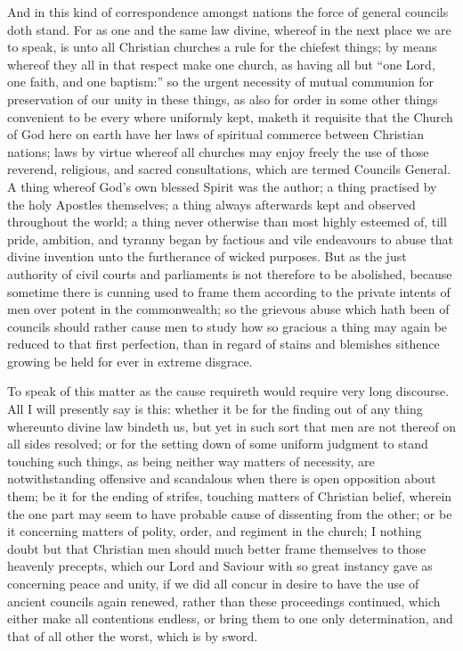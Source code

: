 And in this kind of correspondence amongst nations the force of general councils doth stand. For as one and the same law divine, whereof in the next place we are to speak, is unto all Christian churches a rule for the chiefest things; by means whereof they all in that respect make one church, as having all but “one Lord, one faith, and one baptism:” so the urgent necessity of mutual communion for preservation of our unity in these things, as also for order in some other things convenient to be every where uniformly kept, maketh it requisite that the Church of God here on earth have her laws of spiritual commerce between Christian nations; laws by virtue whereof all churches may enjoy freely the use of those reverend, religious, and sacred consultations, which are termed Councils General. A thing whereof God’s own blessed Spirit was the author; a thing practised by the holy Apostles themselves; a thing always afterwards kept and observed throughout the world; a thing never otherwise than most highly esteemed of, till pride, ambition, and tyranny began by factious and vile endeavours to abuse that divine invention unto the furtherance of wicked purposes. But as the just authority of civil courts and parliaments is not therefore to be abolished, because sometime there is cunning used to frame them according to the private intents of men over potent in the commonwealth; so the grievous abuse which hath been of councils should rather cause men to study how so gracious a thing may again be reduced to that first perfection, than in regard of stains and blemishes sithence growing be held for ever in extreme disgrace.


To speak of this matter as the cause requireth would require very long discourse. All I will presently say is this: whether it be for the finding out of any thing whereunto divine law bindeth us, but yet in such sort that men are not thereof on all sides resolved; or for the setting down of some uniform judgment to stand touching such things, as being neither way matters of necessity, are notwithstanding offensive and scandalous when there is open opposition about them; be it for the ending of strifes, touching matters of Christian belief, wherein the one part may seem to have probable cause of dissenting from the other; or be it concerning matters of polity, order, and regiment in the church; I nothing doubt but that Christian men should much better frame themselves to those heavenly precepts, which our Lord and Saviour with so great instancy gave as concerning peace and unity, if we did all concur in desire to have the use of ancient councils again renewed, rather than these proceedings continued, which either make all contentions endless, or bring them to one only determination, and that of all other the worst, which is by sword.

